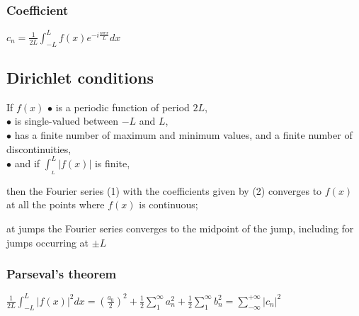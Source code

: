 \documentclass{article}
\begin{document}
\subsubsection{Coefficient}
$c_n = \frac{1}{2L}\displaystyle\int_{-L}^{L}f(x)e^{-i\frac{n\pi x}{L}}dx$

\subsection{Dirichlet conditions}
If $f(x)$
$\bullet$ is a periodic function of period $2L$,\\
$\bullet$ is single-valued between $-L$ and $L$,\\
$\bullet$ has a finite number of maximum and minimum values, and a finite number of discontinuities,\\
$\bullet$ and if $\displaystyle\int_{_L}^L|f(x)|$ is finite,

then the Fourier series (1) with the coefficients given by (2) converges to $f(x)$ at all the points where $f(x)$ is continuous;

at jumps the Fourier series converges to the midpoint of the jump, including for jumps occurring at $\pm L$

\subsubsection{Parseval's theorem}
$\frac{1}{2L}\displaystyle\int_{-L}^L|f(x)|^2dx = \left(\frac{a_0}{2}\right)^2 + \frac{1}{2}\displaystyle\sum^{\infty}_{1}a_n^2 + \frac{1}{2}\displaystyle\sum_1^{\infty}b_n^2 = \displaystyle\sum_{-\infty}^{+\infty}|c_n|^2$
\end{document}
